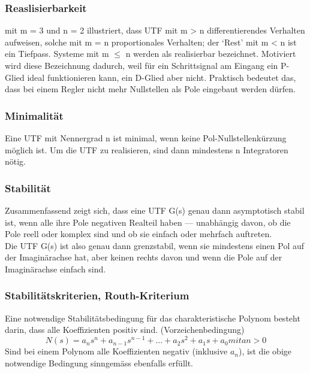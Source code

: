 \subsubsection{Reaslisierbarkeit}
mit m = 3 und n = 2 illustriert, dass UTF mit m > n differentierendes Verhalten
aufweisen, solche mit m = n proportionales Verhalten; der ‘Rest’ mit m < n ist
ein Tiefpass. Systeme mit m $\leq$ n werden als realisierbar bezeichnet. Motiviert wird
diese Bezeichnung dadurch, weil für ein Schrittsignal am Eingang ein P-Glied ideal
funktionieren kann, ein D-Glied aber nicht. Praktisch bedeutet das, dass bei einem Regler nicht mehr Nullstellen als Pole
eingebaut werden dürfen.
\subsubsection{Minimalität}

Eine UTF mit Nennergrad n ist minimal, wenn keine Pol-Nullstellenkürzung
möglich ist. Um die UTF zu realisieren, sind dann mindestens n Integratoren nötig.

\subsubsection{Stabilität}

Zusammenfassend zeigt sich, dass eine UTF G(s) genau dann asymptotisch stabil
ist, wenn alle ihre Pole negativen Realteil haben — unabhängig davon, ob die Pole
reell oder komplex sind und ob sie einfach oder mehrfach auftreten.\\
Die UTF G(s) ist
also genau dann grenzstabil, wenn sie mindestens einen Pol auf der Imaginärachse
hat, aber keinen rechts davon und wenn die Pole auf der Imaginärachse einfach sind.
\subsubsection{Stabilitätskriterien, Routh-Kriterium}

Eine notwendige Stabilitätsbedingung für das charakteristische Polynom besteht darin, dass alle Koeffizienten positiv sind. (Vorzeichenbedingung)
\begin{equation}
\boxed{N(s) = a_{n}s^n + a_{n-1}s^{n-1} + . . . + a_2s^2 + a_1s + a_0 mit an > 0}
\end{equation}
Sind bei einem Polynom alle Koeffizienten negativ (inklusive $a_n$), ist die obige
notwendige Bedingung sinngemäss ebenfalls erfüllt.



